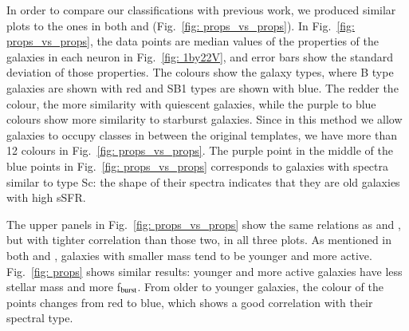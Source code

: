         In order to compare our classifications with previous work, we produced similar plots to the ones in both  and  (Fig.~\ref{fig: props_vs_props}).
        In Fig.~\ref{fig: props_vs_props}, the data points are median values of the properties of the galaxies in each neuron in Fig.~\ref{fig: 1by22V}, and error bars show the standard deviation of those properties.
        The colours show the galaxy types, where B type galaxies are shown with red and SB1 types are shown with blue.
        The redder the colour, the more similarity with quiescent galaxies, while the purple to blue colours show more similarity to starburst galaxies.
        Since in this method we allow galaxies to occupy classes in between the original  templates, we have more than 12 colours in Fig.~\ref{fig: props_vs_props}.
        The purple point in the middle of the blue points in Fig.~\ref{fig: props_vs_props} corresponds to galaxies with spectra similar to type Sc: the shape of their spectra indicates that they are old galaxies with high sSFR.
        
        The upper panels in Fig.~\ref{fig: props_vs_props} show the same relations as  and , but with tighter correlation than those two, in all three plots.
        As mentioned in both  and , galaxies with smaller mass tend to be younger and more active.
        Fig.~\ref{fig: props} shows similar results: younger and more active galaxies have less stellar mass and more f$_{\rm {burst}}$.
        From older to younger galaxies, the colour of the points changes from red to blue, which shows a good correlation with their spectral type.
        
